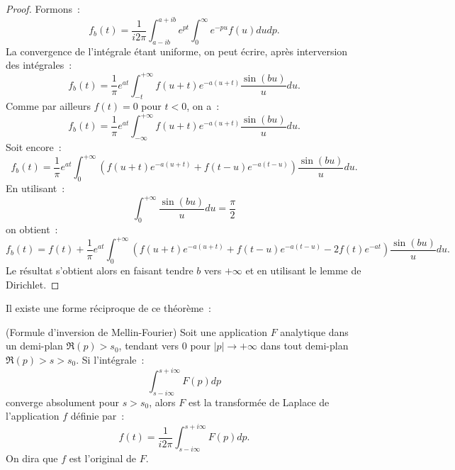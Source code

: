 \begin{proof}
Formons~:
\[
f_b(t) = \frac{1}{i 2 \pi}  \int_{a-ib}^{a+ib} e^{pt} \int_0^{\infty}
e^{-pu} f(u) du dp.
\]
La convergence de l'intégrale étant uniforme, on peut écrire, après
interversion des intégrales~:
\[
f_b(t) = \frac{1}{\pi} e^{at} \int_{-t}^{+\infty} f(u+t)e^{-a(u+t)}
\frac{\sin (b u)}{u} du.
\]
Comme par ailleurs $f(t) = 0$ pour $t < 0$, on a~:
\[
f_b(t) = \frac{1}{\pi} e^{at} \int_{-\infty}^{+\infty} f(u+t)e^{-a(u+t)}
\frac{\sin (b u)}{u} du.
\]
Soit encore~:
\[
f_b(t) = \frac{1}{\pi} e^{at} \int_{0}^{+\infty} \left (
f(u+t)e^{-a(u+t)} + f(t-u)e^{-a(t-u)}
\right )
\frac{\sin (b u)}{u} du.
\]
En utilisant~:
\[
\int_0^{+\infty} \frac{\sin (b u)}{u} du = \frac{\pi}{2}
\]
on obtient~:
\[
f_b(t) = f(t)  + \frac{1}{\pi} e^{at} \int_{0}^{+\infty} \left (
f(u+t)e^{-a(u+t)} + f(t-u)e^{-a(t-u)} - 2 f(t)e^{-at}
\right )
\frac{\sin (b u)}{u} du.
\]
Le résultat s'obtient alors en faisant tendre $b$ vers $+\infty$ et en utilisant le lemme de Dirichlet.
\end{proof} 
Il existe une forme réciproque de ce théorème~:

\begin{fthm}(Formule d'inversion de Mellin-Fourier)
Soit une application $F$ analytique dans un demi-plan $\Re(p) > s_0$,
tendant vers 0 pour $|p| \to +\infty$ dans tout demi-plan $\Re(p) > s
> s_0$. Si l'intégrale~:
\[
\int_{s-i \infty}^{s+i \infty} F(p) dp
\]
converge absolument pour $s > s_0$, alors $F$ est la transformée de
Laplace de l'application $f$ définie par~:
\[
f(t) = \frac{1}{i 2 \pi} \int_{s-i \infty}^{s+i \infty} F(p) dp.
\]
On dira que $f$ est l'original de $F.$
\end{fthm}

